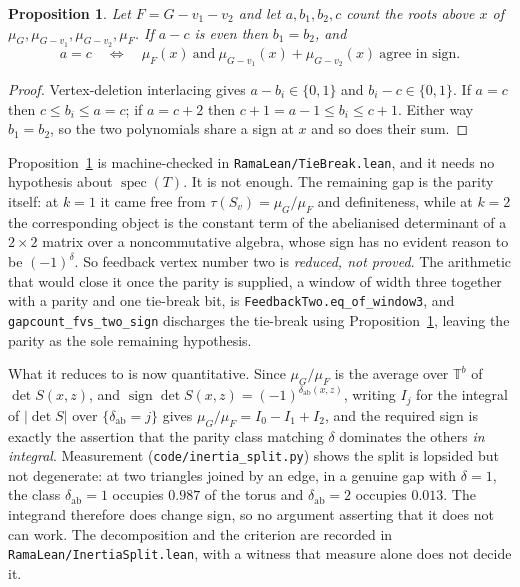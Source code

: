 \documentclass[11pt]{article}
\newtheorem{proposition}[theorem]{Proposition}
\theoremstyle{remark}
\begin{document}
\begin{proposition}\label{prop:tiebreak}
Let $F=G-v_1-v_2$ and let $a,b_1,b_2,c$ count the roots above $x$ of
$\mu_G,\mu_{G-v_1},\mu_{G-v_2},\mu_F$. If $a-c$ is even then $b_1=b_2$, and
\[
a=c\quad\Longleftrightarrow\quad \mu_F(x)\ \text{and}\ \mu_{G-v_1}(x)+\mu_{G-v_2}(x)\ \text{agree in sign}.
\]
\end{proposition}

\begin{proof}
Vertex-deletion interlacing gives $a-b_i\in\{0,1\}$ and $b_i-c\in\{0,1\}$. If $a=c$ then
$c\le b_i\le a=c$; if $a=c+2$ then $c+1=a-1\le b_i\le c+1$. Either way $b_1=b_2$, so the two
polynomials share a sign at $x$ and so does their sum.
\end{proof}

Proposition~\ref{prop:tiebreak} is machine-checked in \texttt{RamaLean/TieBreak.lean}, and it
needs no hypothesis about $\operatorname{spec}(T)$. It is not enough. The remaining gap is the
parity itself: at $k=1$ it came free from $\tau(S_v)=\mu_G/\mu_F$ and definiteness, while at
$k=2$ the corresponding object is the constant term of the abelianised determinant of a
$2\times2$ matrix over a noncommutative algebra, whose sign has no evident reason to be
$(-1)^{\delta}$. So feedback vertex number two is \emph{reduced, not proved}. The arithmetic
that would close it once the parity is supplied, a window of width three together with a
parity and one tie-break bit, is \texttt{FeedbackTwo.eq\_of\_window3}, and
\texttt{gapcount\_fvs\_two\_sign} discharges the tie-break using
Proposition~\ref{prop:tiebreak}, leaving the parity as the sole remaining hypothesis.

What it reduces to is now quantitative. Since $\mu_G/\mu_F$ is the average over
$\mathbb T^b$ of $\det S(x,z)$, and $\operatorname{sign}\det S(x,z)=(-1)^{\delta_{\mathrm{ab}}(x,z)}$,
writing $I_j$ for the integral of $|\det S|$ over $\{\delta_{\mathrm{ab}}=j\}$ gives
$\mu_G/\mu_F=I_0-I_1+I_2$, and the required sign is exactly the assertion that the parity
class matching $\delta$ dominates the others \emph{in integral}. Measurement
(\texttt{code/inertia\_split.py}) shows the split is lopsided but not degenerate: at two
triangles joined by an edge, in a genuine gap with $\delta=1$, the class
$\delta_{\mathrm{ab}}=1$ occupies $0.987$ of the torus and $\delta_{\mathrm{ab}}=2$ occupies
$0.013$. The integrand therefore does change sign, so no argument asserting that it does not
can work. The decomposition and the criterion are recorded in
\texttt{RamaLean/InertiaSplit.lean}, with a witness that measure alone does not decide it.
\end{document}
